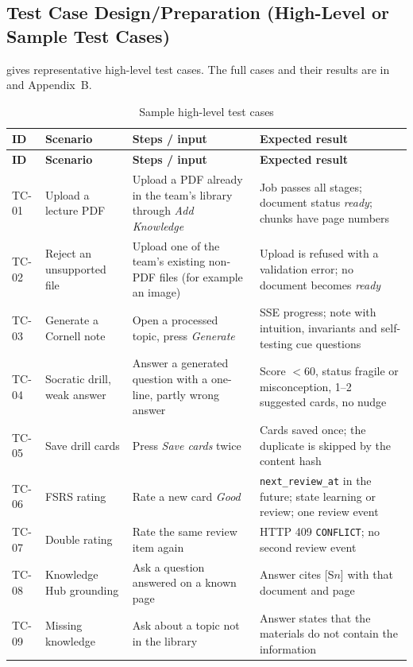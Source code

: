 \subsection{Test Case Design/Preparation (High-Level or Sample Test Cases)}\label{sec:test_cases}

 gives representative high-level test cases. The full cases and
their results are in  and Appendix~B.

{\small
\begin{longtable}{@{}p{}p{}p{}p{}@{}}
\caption{Sample high-level test cases}\label{tab:sample_tests}\\
\toprule
\textbf{ID} & \textbf{Scenario} & \textbf{Steps / input} & \textbf{Expected result}\\
\midrule
\endfirsthead
\toprule
\textbf{ID} & \textbf{Scenario} & \textbf{Steps / input} & \textbf{Expected result}\\
\midrule
\endhead
\bottomrule
\endfoot
TC-01 & Upload a lecture PDF & Upload a PDF already in the team's library through \emph{Add Knowledge} & Job passes all stages; document status \emph{ready}; chunks have page numbers\\
TC-02 & Reject an unsupported file & Upload one of the team's existing non-PDF files (for example an image) & Upload is refused with a validation error; no document becomes \emph{ready}\\
TC-03 & Generate a Cornell note & Open a processed topic, press \emph{Generate} & SSE progress; note with intuition, invariants and self-testing cue questions\\
TC-04 & Socratic drill, weak answer & Answer a generated question with a one-line, partly wrong answer & Score $<60$, status fragile or misconception, 1--2 suggested cards, no nudge\\
TC-05 & Save drill cards & Press \emph{Save cards} twice & Cards saved once; the duplicate is skipped by the content hash\\
TC-06 & FSRS rating & Rate a new card \emph{Good} & \texttt{next\_review\_at} in the future; state learning or review; one review event\\
TC-07 & Double rating & Rate the same review item again & HTTP 409 \texttt{CONFLICT}; no second review event\\
TC-08 & Knowledge Hub grounding & Ask a question answered on a known page & Answer cites [S$n$] with that document and page\\
TC-09 & Missing knowledge & Ask about a topic not in the library & Answer states that the materials do not contain the information\\

\end{longtable}}

